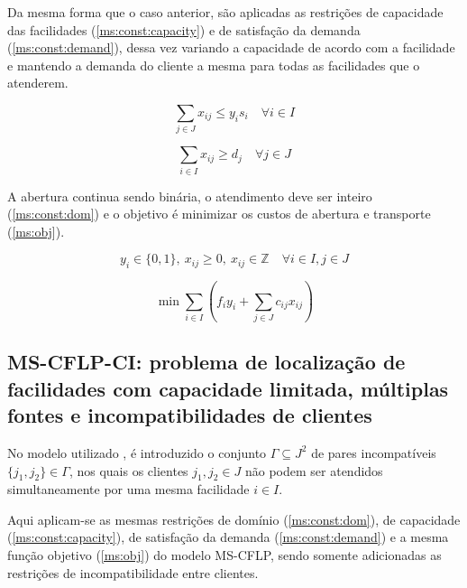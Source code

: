 \documentclass[]{article}
\begin{document}
    
	
	Da mesma forma que o caso anterior, são aplicadas as restrições de capacidade das facilidades (\ref{ms:const:capacity}) e de satisfação da demanda (\ref{ms:const:demand}), dessa vez variando a capacidade de acordo com a facilidade e mantendo a demanda do cliente a mesma para todas as facilidades que o atenderem.
	
	\begin{equation}
		\label{ms:const:capacity}		
		\sum_{j \in J} x_{ij} \le y_i s_i 
		\quad
		\forall i \in I
	\end{equation}	
	
	\begin{equation}
		\label{ms:const:demand}		
		\sum_{i \in I} x_{ij} \ge d_j 
		\quad
		\forall j \in J
	\end{equation}
	
	A abertura continua sendo binária, o atendimento deve ser inteiro (\ref{ms:const:dom}) 
	e o objetivo é minimizar os custos de abertura e transporte (\ref{ms:obj}).
	
	\begin{equation}
		\label{ms:const:dom}		
		y_i \in \{0, 1\}, 
		\ x_{ij} \ge 0, 
		\ x_{ij} \in \mathbb{Z}
		\quad
		\forall i \in I, j \in J
	\end{equation}	
	
	\begin{equation}
		\label{ms:obj}		
		\min \sum_{i \in I} 
		(
		f_i y_i + \sum_{j \in J} c_{ij} x_{ij}
		)
	\end{equation}

 \subsection{MS-CFLP-CI: problema de localização de facilidades com capacidade limitada, múltiplas fontes e incompatibilidades de clientes}
    
 
	No modelo utilizado \cite{mess}, é introduzido o conjunto $\Gamma \subseteq J^2$ de pares incompatíveis $\{ j_1, j_2 \} \in \Gamma$, 
	nos quais os clientes $j_1, j_2 \in J$ não podem ser atendidos simultaneamente por uma mesma facilidade $i \in I$.

    Aqui aplicam-se as mesmas restrições de domínio (\ref{ms:const:dom}), de capacidade (\ref{ms:const:capacity}), de satisfação da demanda (\ref{ms:const:demand}) e a mesma função objetivo (\ref{ms:obj}) do modelo MS-CFLP, sendo somente adicionadas as restrições de incompatibilidade entre clientes.
 
\end{document}
